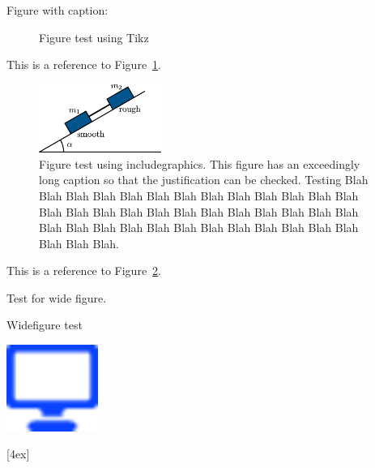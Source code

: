 \documentclass[solutionsatend,twocolumnsolutions]{ouunit}
\begin{document}
Figure with caption:
\begin{figure}
\caption{Figure test using Tikz}
\label{fig-test-tikz}
\end{figure}

This is a reference to Figure~\ref{fig-test-tikz}.

\begin{figure}
\caption{Figure test using includegraphics\label{fig-test-includegraphics}. This figure has an exceedingly long caption so that the justification can be checked. Testing Blah Blah Blah Blah Blah Blah Blah Blah Blah Blah Blah Blah Blah Blah Blah Blah Blah Blah Blah Blah Blah Blah Blah Blah Blah Blah Blah Blah Blah Blah Blah Blah Blah Blah Blah Blah Blah Blah Blah Blah.}
\includegraphics[width=4cm]{test}
\end{figure}
This is a reference to Figure~\ref{fig-test-includegraphics}.

Test for wide figure.

\lipsum[134]

\begin{widefigure}
\caption{Widefigure test\label{fig-test-widefigure-one}}
\end{widefigure}


\lipsum[134]
\begin{marginfigure*}
\includegraphics[width=3cm]{icon}
\end{marginfigure*}
[4ex]
\end{document}
